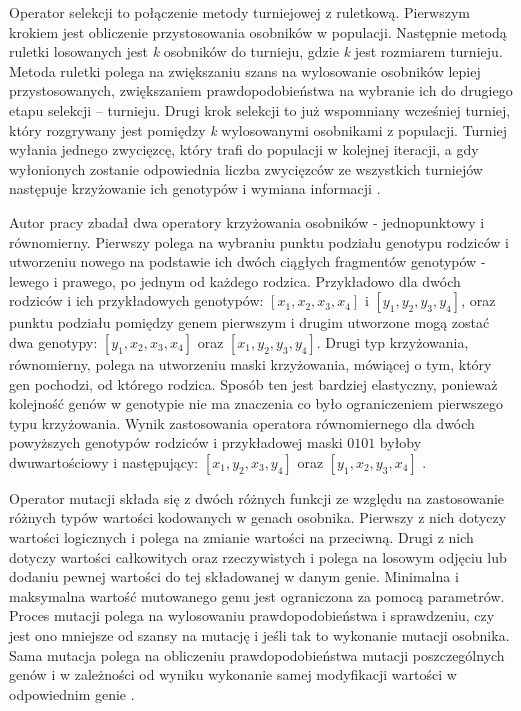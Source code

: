 \documentclass[11pt,a4paper]{llncs}
\begin{document}
Operator selekcji to połączenie metody turniejowej z ruletkową.
Pierwszym krokiem jest obliczenie przystosowania osobników w populacji.
Następnie metodą ruletki losowanych jest \emph{k} osobników do turnieju, gdzie \emph{k} jest rozmiarem turnieju.
Metoda ruletki polega na zwiększaniu szans na wylosowanie osobników lepiej przystosowanych, zwiększaniem prawdopodobieństwa na wybranie ich do drugiego etapu selekcji -- turnieju.
Drugi krok selekcji to już wspomniany wcześniej turniej, który rozgrywany jest pomiędzy \emph{k} wylosowanymi osobnikami z populacji.
Turniej wyłania jednego zwycięzcę, który trafi do populacji w kolejnej iteracji, a gdy wyłonionych zostanie odpowiednia liczba zwycięzców ze wszystkich turniejów następuje krzyżowanie ich genotypów i wymiana informacji \cite[str. 29]{klyk}.



Autor pracy \cite{klyk} zbadał dwa operatory krzyżowania osobników - jednopunktowy i równomierny.
Pierwszy polega na wybraniu punktu podziału genotypu rodziców i utworzeniu nowego na podstawie ich dwóch ciągłych fragmentów genotypów - lewego i prawego, po jednym od każdego rodzica.
Przykładowo dla dwóch rodziców i ich przykładowych genotypów: \( [x_{1}, x_{2}, x_{3}, x_{4}] \) i \( [y_{1}, y_{2}, y_{3}, y_{4}] \), oraz punktu podziału pomiędzy genem pierwszym i drugim utworzone mogą zostać dwa genotypy:  \( [y_{1}, x_{2}, x_{3}, x_{4}] \) oraz \( [x_{1}, y_{2}, y_{3}, y_{4}] \).
Drugi typ krzyżowania, równomierny, polega na utworzeniu maski krzyżowania, mówiącej o tym, który gen pochodzi, od którego rodzica.
Sposób ten jest bardziej elastyczny, ponieważ kolejność genów w genotypie nie ma znaczenia co było ograniczeniem pierwszego typu krzyżowania.
Wynik zastosowania operatora równomiernego dla dwóch powyższych genotypów rodziców i przykładowej maski \( 0101 \) byłoby dwuwartościowy i następujący: \( [x_{1}, y_{2}, x_{3}, y_{4}] \) oraz \( [y_{1}, x_{2}, y_{3}, x_{4}] \) \cite[str. 32]{klyk}.


 
Operator mutacji składa się z dwóch różnych funkcji ze względu na zastosowanie różnych typów wartości kodowanych w genach osobnika.
Pierwszy z nich dotyczy wartości logicznych i polega na zmianie wartości na przeciwną.
Drugi z nich dotyczy wartości całkowitych oraz rzeczywistych i polega na losowym odjęciu lub dodaniu pewnej wartości do tej składowanej w danym genie.
Minimalna i maksymalna wartość mutowanego genu jest ograniczona za pomocą parametrów.
Proces mutacji polega na wylosowaniu prawdopodobieństwa i sprawdzeniu, czy jest ono mniejsze od szansy na mutację i jeśli tak to wykonanie mutacji osobnika.
Sama mutacja polega na obliczeniu prawdopodobieństwa mutacji poszczególnych genów i w zależności od wyniku wykonanie samej modyfikacji wartości w odpowiednim genie \cite[str. 31]{klyk}.
\end{document}
